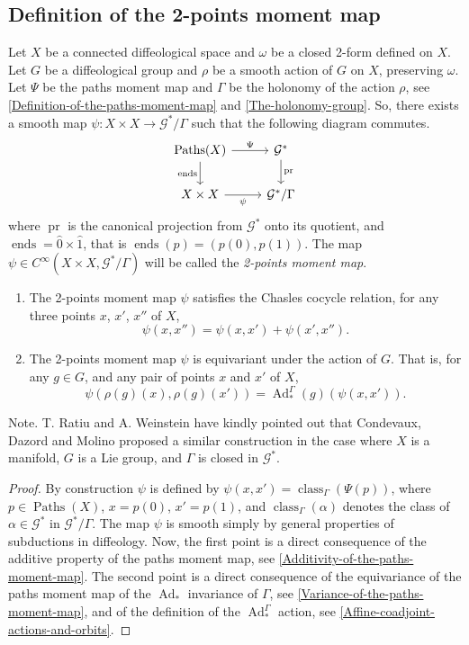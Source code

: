 \documentclass[10pt,reqno,twoside]{amsart}
\newcommand{\cG}{\mathcal{G}}
\DeclareMathOperator{\pr}{pr}
\DeclareMathOperator{\Ad}{Ad}
\DeclareMathOperator{\Paths}{Paths}
\DeclareMathOperator{\class}{class}
\DeclareMathOperator{\bounds}{ends}
\newcommand{\Cinfty}{C^\infty}
\newcommand{\but}{\hat{1}}
\newcommand{\source}{\hat{0}}
\theoremstyle{plain}
\theoremstyle{definition}
\newcommand{\article}[1]{\subsection{#1}}
\begin{document}
  \article{Definition of the 2-points moment map}
  \label{Definition-of-the-2-points-moment-map}
  Let $X$ be a connected diffeological space and $\omega$ be a closed 2-form defined on $X$.
  Let $G$ be a diffeological group and $\rho$ be a smooth action of $G$ on $X$,
  preserving $\omega$.
  Let $\Psi$ be the paths moment map and $\Gamma$ be the holonomy of the action $\rho$,
  see \ref{Definition-of-the-paths-moment-map} and \ref{The-holonomy-group}.
  So,
  there exists a smooth map $\psi : X \times X \to \cG^* / \Gamma$ such that the following diagram commutes.
  \[
  \begin{tikzcd}
    \Paths(X) \arrow[r, "\Psi"] \arrow[d, "\bounds"'] & \cG^* \arrow[d, "\pr"] \\
    X \times X \arrow[r, "\psi"'] & \cG^*/\Gamma
  \end{tikzcd}
  \]
  where $\pr$ is the canonical projection from $\cG^*$ onto its quotient,
  and $\bounds = \source \times \but$,
  that is $\bounds(p) = (p(0),p(1))$.
  The map $\psi \in \Cinfty(X \times X, \cG^*\!/\Gamma)$ will be called the {\em 2-points moment map}.
  \begin{enumerate}
    \item The 2-points moment map $\psi$ satisfies the Chasles cocycle relation, for any three points $x$, $x'$, $x''$ of $X$,
    \begin{equation}
      \label{eq:heartsuit2}
      \psi(x,x'') = \psi(x,x') + \psi(x',x'') .
    \end{equation}
    \item The 2-points moment map $\psi$ is equivariant under the action of $G$. That is, for any $g \in G$, and any pair of points $x$ and $x'$ of $X$,
    $$
      \psi(\rho(g)(x), \rho(g)(x')) =
      \Ad_*^\Gamma(g)(\psi(x,x')).
      $$
  \end{enumerate}
  {\sc Note.} T. Ratiu and A. Weinstein have kindly pointed out that Condevaux,
  Dazord and Molino \cite{CDM88} proposed a similar construction in the case where $X$ is a manifold,
  $G$ is a Lie group,
  and $\Gamma$ is closed in $\cG^*$.
  
  \begin{proof}
    By construction $\psi$ is defined by $\psi(x,x') = \class_\Gamma(\Psi(p))$,
    where $p \in \Paths(X)$,
    $x = p(0)$,
    $x' = p(1)$,
    and $\class_\Gamma(\alpha)$ denotes the class of $\alpha \in \cG^*$ in $\cG^*\!/\Gamma$.
    The map $\psi$ is smooth simply by general properties of subductions in diffeology.
    Now,
    the first point is a direct consequence of the additive property of the paths moment map,
    see \ref{Additivity-of-the-paths-moment-map}.
    The second point is a direct consequence of the equivariance of the paths moment map of the $\Ad_*$ invariance of $\Gamma$,
    see \ref{Variance-of-the-paths-moment-map},
    and of the definition of the $\Ad_*^\Gamma$ action,
    see \ref{Affine-coadjoint-actions-and-orbits}.
  \end{proof}
  
\end{document}
